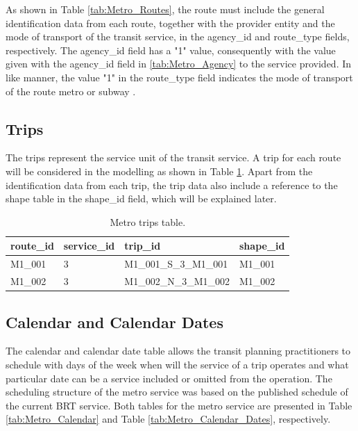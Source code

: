 \documentclass[12pt, a4paper]{report}
\begin{document}
As shown in Table \ref{tab:Metro_Routes}, the route must include the general identification data from each route, together with the provider entity and the mode of transport of the transit service, in the agency\_id and route\_type fields, respectively. The agency\_id field has a "1" value, consequently with the value given with the agency\_id field in \ref{tab:Metro_Agency} to the service provided. In like manner, the value "1" in the route\_type field indicates the mode of transport of the route metro or subway \citep{mobiltydataGeneralTransitFeed2023}. 

\subsection{Trips}

The trips represent the service unit of the transit service. A trip for each route will be considered in the modelling as shown in Table \ref{tab:Metro_Trips}. Apart from the identification data from each trip, the trip data also include a reference to the shape table in the shape\_id field, which will be explained later.




\begin{table}[ht]
\centering
\renewcommand{\arraystretch}{1.5}
\begin{tabular}{llll}
  \hline
  route\_id & service\_id & trip\_id & shape\_id \\ 
  \hline
  M1\_001 & 3 & M1\_001\_S\_3\_M1\_001 & M1\_001 \\ M1\_002 & 3 & M1\_002\_N\_3\_M1\_002 & M1\_002 \\ 
   \hline
\end{tabular}%
\caption{Metro trips table.}
\label{tab:Metro_Trips}
\end{table}

\subsection{Calendar and Calendar Dates}

The calendar and calendar date table allows the transit planning practitioners to schedule with days of the week when will the service of a trip operates and what particular date can be a service included or omitted from the operation. The scheduling structure of the metro service was based on the published schedule of the current BRT service. Both tables for the metro service are presented in Table \ref{tab:Metro_Calendar} and Table \ref{tab:Metro_Calendar_Dates}, respectively.
\end{document}
